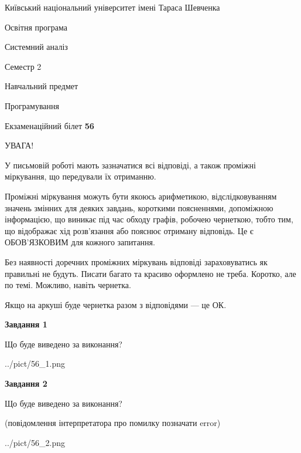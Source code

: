\documentclass[12pt, ukrainian]{article}
\begin{document}
{{\begin {small}\par
{ \center  Київський національний університет імені Тараса Шевченка \par}
{\parbox {5 cm}{Освітня програма \hfill}{\parbox {7 cm}{Системний аналіз \hfill}}\parbox {6 cm}{\hfill Семестр 2}}\par
{\parbox {5 cm} {Навчальний предмет \hfill}\parbox {7 cm}{Програмування \hfill}\parbox {6cm}{\hfill}\par}\vspace{-7pt} \end{small}}{\center Екзаменаційний білет \No \textbf
{ 56 }\par}}
{
\begin {large}
УВАГА!

У письмовій роботі мають зазначатися всі відповіді, а також проміжні міркування, що передували їх отриманню.

Проміжні міркування можуть бути якоюсь арифметикою, відслідковуванням зна\-чень змінних для деяких завдань,
короткими поясненнями, допоміжною інформацією, що виникає під час обходу графів, робочею чернеткою,
тобто тим, що відображає хід розв’язання або пояснює отриману відповідь.
Це є ОБОВ’ЯЗКОВИМ для кожного запитання.

Без наявності доречних проміжних міркувань відповіді зараховуватись як правиль\-ні не будуть.
Писати багато та красиво оформлено не треба. Коротко, але по темі. Можли\-во, навіть чернетка.

Якщо на аркуші буде чернетка разом з відповідями --- це ОК.

\newpage

{\begin {center}\textbf{Завдання 1}\end {center}}\par
Що буде виведено за виконання?\par
\begin{center}
	{../pict/56_1.png}
\end{center}
\newpage

{\begin {center}\textbf{Завдання 2}\end {center}}\par
Що буде виведено за виконання?\par
 (повідомлення інтерпретатора про помилку позначати error)\par
\begin{center}
	{../pict/56_2.png}
\end{center}
\newpage


\end{large}}
\end{document}
